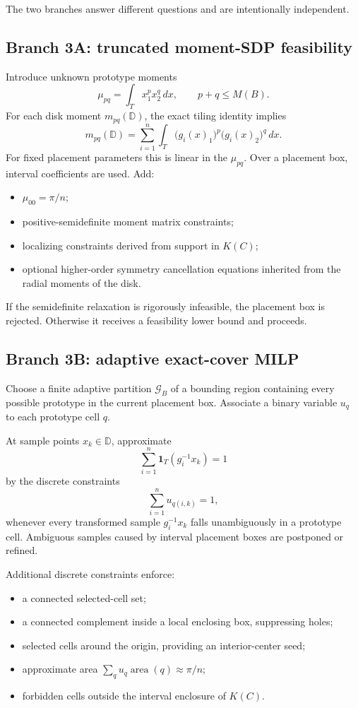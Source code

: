 \documentclass[11pt]{article}
\newcommand{\D}{\mathbb D}
\newcommand{\area}{\operatorname{area}}
\begin{document}
The two branches answer different questions and are intentionally independent.

\subsection{Branch 3A: truncated moment-SDP feasibility}

Introduce unknown prototype moments
\[
\mu_{pq}=\int_T x_1^p x_2^q\,dx,
\qquad p+q\le M(B).
\]
For each disk moment $m_{pq}(\D)$, the exact tiling identity implies
\[
m_{pq}(\D)=\sum_{i=1}^n\int_T \bigl(g_i(x)_1\bigr)^p\bigl(g_i(x)_2\bigr)^q\,dx.
\]
For fixed placement parameters this is linear in the $\mu_{pq}$. Over a placement box, interval coefficients are used. Add:
\begin{itemize}[leftmargin=7mm]
\item $\mu_{00}=\pi/n$;
\item positive-semidefinite moment matrix constraints;
\item localizing constraints derived from support in $K(C)$;
\item optional higher-order symmetry cancellation equations inherited from the radial moments of the disk.
\end{itemize}

If the semidefinite relaxation is rigorously infeasible, the placement box is rejected. Otherwise it receives a feasibility lower bound and proceeds.

\subsection{Branch 3B: adaptive exact-cover MILP}

Choose a finite adaptive partition $\mathcal G_B$ of a bounding region containing every possible prototype in the current placement box. Associate a binary variable $u_q$ to each prototype cell $q$.

At sample points $x_k\in\D$, approximate
\[
\sum_{i=1}^n \mathbf 1_T(g_i^{-1}x_k)=1
\]
by the discrete constraints
\[
\sum_{i=1}^n u_{q(i,k)}=1,
\]
whenever every transformed sample $g_i^{-1}x_k$ falls unambiguously in a prototype cell. Ambiguous samples caused by interval placement boxes are postponed or refined.

Additional discrete constraints enforce:
\begin{itemize}[leftmargin=7mm]
\item a connected selected-cell set;
\item a connected complement inside a local enclosing box, suppressing holes;
\item selected cells around the origin, providing an interior-center seed;
\item approximate area $\sum_q u_q\area(q)\approx\pi/n$;
\item forbidden cells outside the interval enclosure of $K(C)$.
\end{itemize}
\end{document}
